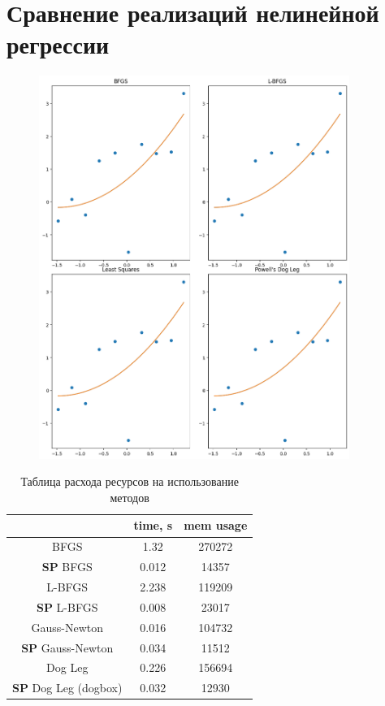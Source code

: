 \documentclass[a4paper,14pt,oneside,openany]{memoir}
\begin{document}
\section{Сравнение реализаций нелинейной регрессии}
\FloatBarrier
\begin{figure}[ht]
	\centering
	\includegraphics[width=0.9\textwidth]{img/4_2_1.png}
\end{figure}
\FloatBarrier
\begin{table}
	\centering
	\begin{tabular}{|c|c|c| }
	\hline
	& time, s & mem usage \\
	\hline
	BFGS & 1.32 & 270272 \\
	\hline
	\textbf{SP} BFGS & 0.012 & 14357 \\
	\hline
	L-BFGS & 2.238 & 119209 \\
	\hline
	\textbf{SP} L-BFGS & 0.008 & 23017  \\
	\hline
	Gauss-Newton & 0.016 & 104732  \\ 
	\hline
	\textbf{SP} Gauss-Newton & 0.034 & 11512 \\ 
	\hline
	Dog Leg & 0.226 & 156694 \\
	\hline
	\textbf{SP} Dog Leg (dogbox) & 0.032 & 12930   \\ 
	\hline
	\end{tabular}
	\caption{Таблица расхода ресурсов на использование методов}
\end{table}
\FloatBarrier
\end{document}

